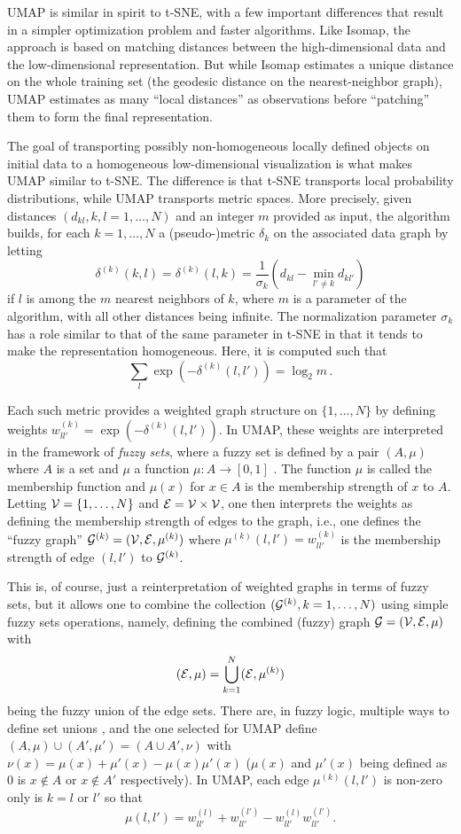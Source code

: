 UMAP is similar in spirit to t-SNE, with a few important differences that result in a simpler optimization problem and faster algorithms. Like Isomap, the approach is based on matching distances between the high-dimensional data and the low-dimensional representation. But while Isomap estimates a unique distance on the whole training set (the geodesic distance on the nearest-neighbor graph), UMAP estimates as many ``local distances'' as observations before ``patching'' them to form the final representation. 

The goal of transporting possibly non-homogeneous locally defined objects on initial data to a homogeneous low-dimensional visualization is what makes UMAP similar to t-SNE. The difference is that t-SNE transports local probability distributions, while UMAP transports metric spaces. More precisely, given distances $(d_{kl}, k,l=1, \ldots, N)$ and an integer $m$ provided as input, the algorithm builds, for each $k=1, \ldots, N$ a (pseudo-)metric $\delta_k$ on the associated data graph by letting
\[
\delta^{(k)}(k,l) = \delta^{(k)}(l,k) = \frac{1}{\sigma_k}\left(d_{kl} - \min_{l'\neq   k} d_{kl'}\right)
\]
if $l$ is among the $m$ nearest neighbors of $k$, where $m$ is a parameter of the algorithm, with all other distances being infinite. The normalization parameter $\sigma_k$ has a role similar to that of the same parameter in t-SNE in that it   tends to make the representation  homogeneous.  Here, it is computed such that
\[
\sum_l \exp(-\delta^{(k)}(l,l')) = \log_2 m\,.
\]
   
Each such metric provides a weighted graph structure on $\{1, \ldots, N\}$ by defining weights $w^{(k)}_{ll'} = \exp(-\delta^{(k)}(l,l'))$. 
In UMAP, these weights are interpreted in the framework of {\em fuzzy sets}, where a fuzzy set is defined by a pair $(A, \mu)$ where $A$ is a set and $\mu$ a function $\mu: A\to [0,1]$ \citep{zadeh1996fuzzy}. The function $\mu$ is called the membership function and $\mu(x)$ for $x\in A$ is the membership strength of $x$ to $A$.  Letting ${\mathcal V} = \{1, \ldots, N\}$ and ${\mathcal E} = {\mathcal V} \times {\mathcal V}$, one then interprets the weights as defining the membership strength of edges to the graph, i.e., one defines the ``fuzzy graph'' ${\mathcal G}^{(k)} = ({\mathcal V}, {\mathcal E}, \mu^{(k)})$ where $\mu^{(k)}(l,l') = w^{(k)}_{ll'}$ is the membership strength of edge $(l,l')$ to  ${\mathcal G}^{(k)}$.

This is, of course, just a reinterpretation of weighted graphs in terms of fuzzy sets, but it allows one to combine the collection $({\mathcal G}^{(k)}, k=1, \ldots, N)$ using simple fuzzy sets operations, namely, defining the combined (fuzzy) graph ${\mathcal G}  = ({\mathcal V}, {\mathcal E}, \mu)$ with 
\[
({\mathcal E}, \mu) = \bigcup_{k=1}^N ({\mathcal E}, \mu^{(k)})
\]
being the fuzzy union of the edge sets. There are, in fuzzy logic, multiple ways to define set unions \citep{gupta1991theory}, and the one selected for UMAP define $(A, \mu) \cup (A', \mu') = (A\cup A', \nu)$ with
$\nu(x) = \mu(x) + \mu'(x) - \mu(x)\mu'(x)$ ($\mu(x)$ and $\mu'(x)$ being defined as 0 is $x\not\in A$ or $x\not\in A'$ respectively).   In UMAP, each edge $\mu^{(k)}(l,l')$ is non-zero only is $k=l$ or $l'$ so that
\[
\mu(l,l') = w^{(l)}_{ll'} +  w^{(l')}_{ll'} -  w^{(l)}_{ll'} w^{(l')}_{ll'}.
\]  

